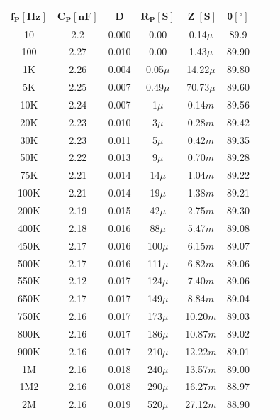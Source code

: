 \documentclass[11pt, a4paper]{article}
\begin{document}
 \begin{center}
     \begin{table}[H]
     \centering
     \renewcommand{\arraystretch}{1.1}
         \begin{tabular}{ c c c c c c c c }
            \hline 
             $\bm{f_P[Hz]}$ &  $\bm{C_P[nF]}$ & $\bm{D}$& $\bm{R_P[S]}$ & $\bm{|Z|[S]}$ & $\bm{\theta}[^\circ]$ \\

             \hline
             10   & 2.2  & 0.000 & 0.00       & 0.14$\mu$   & 89.9  \\
			100  & 2.27 & 0.010 & 0.00       & 1.43$\mu$   & 89.90 \\
			1K   & 2.26 & 0.004 & 0.05$\mu$   & 14.22$\mu$  & 89.80 \\
			5K   & 2.25 & 0.007 & 0.49$\mu$   & 70.73$\mu$  & 89.60 \\
			10K  & 2.24 & 0.007 & 1$\mu$ & 0.14$m$ & 89.56 \\
			20K  & 2.23 & 0.010 & 3$\mu$ & 0.28$m$ & 89.42 \\
			30K  & 2.23 & 0.011 & 5$\mu$  & 0.42$m$    & 89.35 \\
			50K  & 2.22 & 0.013 & 9$\mu$  & 0.70$m$  & 89.28 \\
			75K  & 2.21 & 0.014 & 14$\mu$  & 1.04$m$   & 89.22 \\
			100K & 2.21 & 0.014 & 19$\mu$   & 1.38$m$   & 89.21 \\
			200K & 2.19 & 0.015 & 42$\mu$   & 2.75$m$  & 89.30 \\
			400K & 2.18 & 0.016 & 88$\mu$   & 5.47$m$   & 89.08 \\
			450K & 2.17 & 0.016 & 100$\mu$    & 6.15$m$  & 89.07 \\
			500K & 2.17 & 0.016 & 111$\mu$   & 6.82$m$  & 89.06 \\
			550K & 2.12 & 0.017 & 124$\mu$   & 7.40$m$    & 89.06 \\
			650K & 2.17 & 0.017 & 149$\mu$   & 8.84$m$   & 89.04 \\
			750K & 2.16 & 0.017 & 173$\mu$   & 10.20$m$   & 89.03 \\
			800K & 2.16 & 0.017 & 186$\mu$   & 10.87$m$  & 89.02 \\
			900K & 2.16 & 0.017 & 210$\mu$    & 12.22$m$  & 89.01 \\
			1M   & 2.16 & 0.018 & 240$\mu$    & 13.57$m$  & 89.00 \\
			1M2  & 2.16 & 0.018 & 290$\mu$    & 16.27$m$  & 88.97 \\
			2M   & 2.16 & 0.019 & 520$\mu$    & 27.12$m$ & 88.90 \\

\end{tabular}
\end{table}
\end{center}
\end{document}
